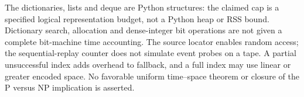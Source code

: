 The dictionaries, lists and deque are Python structures: the claimed cap is a
specified logical representation budget, not a Python heap or RSS bound.
Dictionary search, allocation and dense-integer bit operations are not given a
complete bit-machine time accounting. The source locator enables random access;
the sequential-replay counter does not simulate event probes on a tape.
A partial unsuccessful index adds overhead to fallback, and a full index may
use linear or greater encoded space. No favorable uniform time--space theorem
or closure of the P versus NP implication is asserted.
